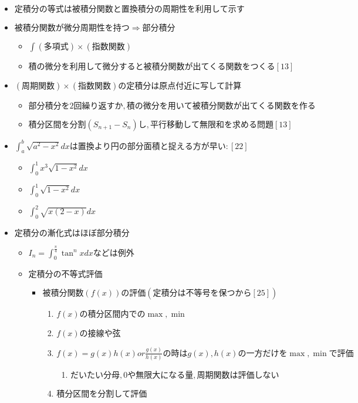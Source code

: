 \documentclass[dvipdfmx,uplatex]{jsarticle}
\begin{document}
\begin{itemize}
\begin{itemize}
\begin{itemize}
		\end{itemize}
		\item $ 定積分の等式は被積分関数と置換積分の周期性を利用して示す$
		\item $ 被積分関数が微分周期性を持つ⇒部分積分$
		\begin{itemize}
			\item $ \int (多項式) \times (指数関数)$
			\item $ 積の微分を利用して微分すると被積分関数が出てくる関数をつくる[13]$
		\end{itemize}
		\item $ (周期関数) \times (指数関数) の定積分は原点付近に写して計算$
		\begin{itemize}
			\item $ 部分積分を2回繰り返すか,積の微分を用いて被積分関数が出てくる関数を作る$
			\item $ 積分区間を分割(S_{n+1} - S_n)し,平行移動して無限和を求める問題 [13]$
		\end{itemize}
		\item $ \int^b_a \sqrt{a^2 - x^2}dx は置換より円の部分面積と捉える方が早い:[22]$
		\begin{itemize}
			\item $\int^1_0 x^3 \sqrt{1-x^2} dx$
			\item $\int^1_0 \sqrt{1-x^2}dx$
			\item $\int^2_0 \sqrt{x(2-x)}dx$
		\end{itemize}
		\item $ 定積分の漸化式はほぼ部分積分$
		\begin{itemize}
			\item $ I_n = \int^{\frac{\pi}{4}}_0 \tan^n x dx などは例外$
			\item $ 定積分の不等式評価$
			\begin{itemize}
				\item $ 被積分関数(f(x))の評価 (定積分は不等号を保つから [25])$
				\begin{enumerate}
					\item $ f(x)の積分区間内での\max, \min$
					\item $ f(x)の接線や弦$
					\item $ f(x) = g(x)h(x) or \frac{g(x)}{h(x)} の時は g(x), h(x) の一方だけを \max , \min で評価$
					\begin{enumerate}
						\item $ だいたい分母, 0や無限大になる量, 周期関数は評価しない$
					\end{enumerate}
					\item $ 積分区間を分割して評価$

\end{enumerate}
\end{itemize}
\end{itemize}
\end{itemize}
\end{itemize}
\end{document}
